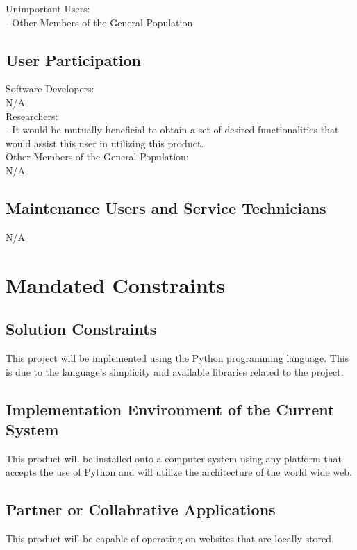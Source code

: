\documentclass[titlepage]{article}
\begin{document}
Unimportant Users:\\
- Other Members of the General Population\\

\subsection*{User Participation}
Software Developers:\\
N/A\\

Researchers:\\
- It would be mutually beneficial to obtain a set of desired functionalities that would assist this user in utilizing this product.\\

Other Members of the General Population:\\
N/A

\subsection*{Maintenance Users and Service Technicians}
N/A


\section{Mandated Constraints}

\subsection*{Solution Constraints}
	This project will be implemented using the Python programming language. This is due to the language’s simplicity and available libraries related to the project.

\subsection*{Implementation Environment of the Current System}
This product will be installed onto a computer system using any platform that accepts the use of Python and will utilize the architecture of the world wide web.

\subsection*{Partner or Collabrative Applications}
This product will be capable of operating on websites that are locally stored.
\end{document}
